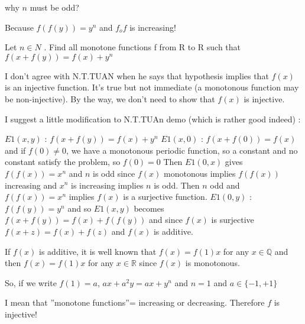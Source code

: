 \begin{mysolution}
	\begin{tcolorbox}why $n$ must be odd?\end{tcolorbox}
Because $f(f(y))=y^{n}$ and $f_{o}f$ is increasing!
\end{mysolution}



\begin{mysolution}
	\begin{tcolorbox}Let $n\in N$ . Find all monotone functions f from R to R such that 
$f(x+f(y))=f(x)+y^{n}$\end{tcolorbox}

I don't agree with N.T.TUAN when he says that hypothesis implies that $f(x)$ is an injective function. It's true but not immediate (a monotonous function may be non-injective). By the way, we don't need to show that $f(x)$ is injective.

I suggest a little modification to N.T.TUAn demo (which is rather good indeed) :

$E1(x,y)$ : $f(x+f(y))=f(x)+y^{n}$
$E1(x,0)$ : $f(x+f(0))=f(x)$ and if $f(0)\neq 0$, we have a monotonous periodic function, so a constant and no constant satisfy the problem, so $f(0)=0$
Then $E1(0,x)$ gives $f(f(x))=x^{n}$ and $n$ is odd since $f(x)$ monotonous implies $f(f(x))$ increasing and $x^{n}$ is increasing implies $n$ is odd.
Then $n$ odd and $f(f(x))=x^{n}$ implies $f(x)$ is a surjective function.
$E1(0,y)$ : $f(f(y))=y^{n}$ and so $E1(x,y)$ becomes $f(x+f(y))=f(x)+f(f(y))$ and since $f(x)$ is surjective $f(x+z)=f(x)+f(z)$ and $f(x)$ is additive.

If $f(x)$ is additive, it is well known that $f(x)=f(1)x$ for any $x\in\mathbb{Q}$ and then $f(x)=f(1)x$ for any $x\in\mathbb{R}$ since $f(x)$ is monotonous.

So, if we write $f(1)=a$, $ax+a^{2}y=ax+y^{n}$ and $n=1$ and $a\in\{-1,+1\}$
\end{mysolution}



\begin{mysolution}
	I mean that ''monotone functions''= increasing or decreasing. Therefore $f$ is injective!
\end{mysolution}



